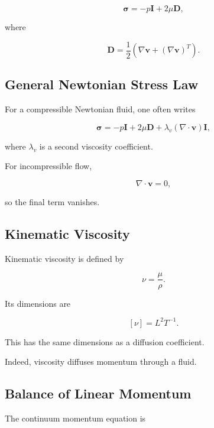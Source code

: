 \[
\boxed{
\boldsymbol{\sigma}
=
-p\mathbf{I}
+
2\mu\mathbf{D},
}
\]

where

\[
\boxed{
\mathbf{D}
=
\frac12
\left(
\nabla\mathbf{v}
+
(\nabla\mathbf{v})^T
\right).
}
\]

\subsection{General Newtonian Stress Law}
\label{subsec:general-newtonian-stress}

For a compressible Newtonian fluid, one often writes

\[
\boxed{
\boldsymbol{\sigma}
=
-p\mathbf{I}
+
2\mu\mathbf{D}
+
\lambda_v
(\nabla\cdot\mathbf{v})\mathbf{I},
}
\]

where \(\lambda_v\) is a second viscosity coefficient.

For incompressible flow,

\[
\nabla\cdot\mathbf{v}=0,
\]

so the final term vanishes.

\subsection{Kinematic Viscosity}
\label{subsec:kinematic-viscosity}

Kinematic viscosity is defined by

\[
\boxed{
\nu
=
\frac{\mu}{\rho}.
}
\]

Its dimensions are

\[
\boxed{
[\nu]
=
L^2T^{-1}.
}
\]

This has the same dimensions as a diffusion coefficient.

Indeed, viscosity diffuses momentum through a fluid.

\subsection{Balance of Linear Momentum}
\label{subsec:fluid-linear-momentum}

The continuum momentum equation is

